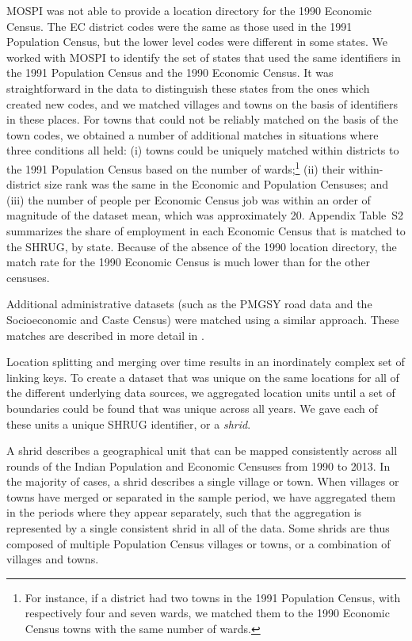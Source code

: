 \documentclass[12pt,letterpaper]{article}
\begin{document}
MOSPI was not able to provide a location directory for the 1990
Economic Census. The EC district codes were the same as those used in
the 1991 Population Census, but the lower level codes were different
in some states. We worked with MOSPI to identify the set of states
that used the same identifiers in the 1991 Population Census and the
1990 Economic Census. It was straightforward in the data to
distinguish these states from the ones which created new codes, and we
matched villages and towns on the basis of identifiers in these
places. For towns that could not be reliably matched on the basis of
the town codes, we obtained a number of additional matches in
situations where three conditions all held: (i) towns could be
uniquely matched within districts to the 1991 Population Census based
on the number of wards;\footnote{For instance, if a district had two
  towns in the 1991 Population Census, with respectively four and
  seven wards, we matched them to the 1990 Economic Census towns with
  the same number of wards.} (ii) their within-district size rank was
the same in the Economic and Population Censuses; and (iii) the number
of people per Economic Census job was within an order of magnitude of
the dataset mean, which was approximately 20. Appendix
Table~S2 summarizes the share of employment
in each Economic Census that is matched to the SHRUG, by
state. Because of the absence of the 1990 location directory, the
match rate for the 1990 Economic Census is much lower than for the
other censuses.

Additional administrative datasets (such as the PMGSY road data and
the Socioeconomic and Caste Census) were matched using a similar
approach. These matches are described in more detail in
.

Location splitting and merging over time results in an inordinately
complex set of linking keys. To create a dataset that was unique on
the same locations for all of the different underlying data sources,
we aggregated location units until a set of boundaries could be found
that was unique across all years. We gave each of these units a unique
SHRUG identifier, or a \textit{shrid}.

A shrid describes a geographical unit that can be mapped consistently across all rounds of the Indian Population and Economic Censuses from 1990 to 2013. In the majority of cases, a shrid describes a single village or town. When villages or towns have merged or separated in the sample period, we have aggregated them in the periods where they appear separately, such that the aggregation is represented by a single consistent shrid in all of the data. Some shrids are thus composed of multiple Population Census villages or towns, or a combination of villages and towns.
\end{document}
